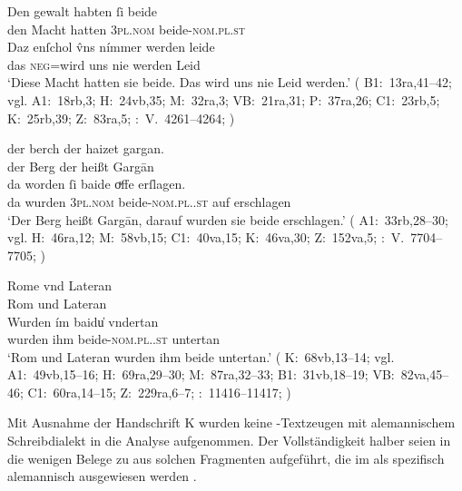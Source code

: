 \begin{exe}
\ex \label{ex:neutralpos}
	\gll Den gewalt habten ſi beide \\
		den Macht hatten \textsc{3pl\subM.nom} beide-\textsc{nom.pl\subM.st} \\
\sn \gll Daz enſchol v̂ns nímmer werden leide \\
		das \textsc{neg}=wird uns nie werden Leid \\
	\trans `Diese Macht hatten sie beide. Das wird uns nie Leid werden.'
		(%
			B1:~13ra,41--42; vgl.
			A1:~18rb,3;
			H:~24vb,35;
			M:~32ra,3;
			VB:~21ra,31;
			P:~37ra,26;
			C1:~23rb,5;
			K:~25rb,39;
			Z:~83ra,5;
			\KC:~V.~4261--4264;
			\cite[159]{schroeder1895}%
		)

\ex \label{ex:neutralpos2}
	\begin{xlist}
	\ex \label{ex:neutralpos2_1}
		\gll der berch der haizet gargan. \\
			der Berg der heißt Gargān \\
	\sn \gll da worden ſi baide oͮffe erſlagen. \\
			da wurden \textsc{3pl\subM.nom} beide-\textsc{nom.pl.\MascM.st} auf
				erschlagen \\
		\trans `Der Berg heißt Gargān, darauf wurden sie beide erschlagen.'
			(%
				A1:~33rb,28--30; vgl.
				H:~46ra,12;
				M:~58vb,15;
				C1:~40va,15;
				K:~46va,30;
				Z:~152va,5;
				\KC:~V.~7704--7705;
				\cite[222]{schroeder1895}%
			)

	\ex \label{ex:neutralpos2_2}
		\gll Rome vnd Lateran \\
			Rom und Lateran \\
	\sn \gll Wurden ím baidu̍ vndertan \\
			wurden ihm beide-\textsc{nom.pl.\NeutI.st} untertan \\
		\trans `Rom und Lateran wurden ihm beide untertan.'
			(%
				K:~68vb,13--14; vgl.
				A1:~49vb,15--16;
				H:~69ra,29--30;
				M:~87ra,32--33;
				B1:~31vb,18--19;
				VB:~82va,45--46;
				C1:~60ra,14--15;
				Z:~229ra,6--7;
				\KC:~11416--11417;
				\cite[290]{schroeder1895}%
			)
		\\
	\end{xlist}
\end{exe}

Mit Ausnahme der Handschrift K wurden keine \KC{}-Text\-zeugen mit
alemannischem Schreibdialekt in die Analyse aufgenommen. Der
Vollständigkeit halber seien in  die wenigen Belege zu
 aus solchen Fragmenten aufgeführt, die im
 \nosh\autocite{hsc} als spezifisch
alemannisch ausgewiesen werden \autocite[vgl.][4, 44,
54]{wolf:kckat}.

